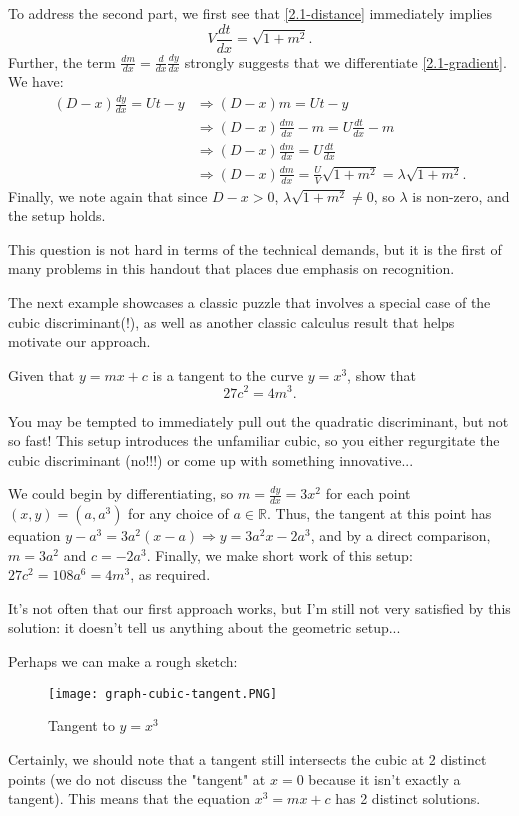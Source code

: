 \documentclass[../jarvis.tex]{subfiles}
\begin{document}
To address the second part, we first see that \eqref{2.1-distance} immediately implies $$V\frac{dt}{dx}=\sqrt{1+m^2}.$$ Further, the term $\frac{dm}{dx}=\frac{d}{dx}\frac{dy}{dx}$ strongly suggests that we differentiate \eqref{2.1-gradient}. We have:
\begin{align*}
    (D-x)\frac{dy}{dx}=Ut-y &\Longrightarrow (D-x)m = Ut-y \\
    &\Longrightarrow (D-x)\frac{dm}{dx}-m=U\frac{dt}{dx}-m \\
    &\Longrightarrow (D-x)\frac{dm}{dx}=U\frac{dt}{dx} \\
    &\Longrightarrow (D-x)\frac{dm}{dx}=\frac{U}{V}\sqrt{1+m^2}=\lambda\sqrt{1+m^2}.
\end{align*}
Finally, we note again that since $D-x > 0$, $\lambda\sqrt{1+m^2} \neq 0$, so $\lambda$ is non-zero, and the setup holds.  

\begin{moral}
This question is not hard in terms of the technical demands, but it is the first of many problems in this handout that places due emphasis on recognition.
\end{moral}

The next example showcases a classic puzzle that involves a special case of the cubic discriminant(!), as well as another classic calculus result that helps motivate our approach.
\begin{example}
Given that $y=mx+c$ is a tangent to the curve $y=x^3$, show that 
$$27c^2=4m^3.$$
\end{example}
You may be tempted to immediately pull out the quadratic discriminant, but not so fast! This setup introduces the unfamiliar cubic, so you either regurgitate the cubic discriminant (no!!!) or come up with something innovative...

We could begin by differentiating, so $m=\frac{dy}{dx}=3x^2$ for each point $(x,y)=(a,a^3)$ for any choice of $a \in \mathbb{R}$. Thus, the tangent at this point has equation $y-a^3=3a^2(x-a) \Longrightarrow y=3a^2x-2a^3$, and by a direct comparison, $m=3a^2$ and $c=-2a^3$.
Finally, we make short work of this setup: $27c^2=108a^6=4m^3$, as required.

It's not often that our first approach works, but I'm still not very satisfied by this solution: it doesn't tell us anything about the geometric setup...

Perhaps we can make a rough sketch:
\begin{figure}[H]
    \centering
    \texttt{[image: graph-cubic-tangent.PNG]}
    \caption{Tangent to $y=x^3$}
    \label{fig:graph-cubic-tangent}
\end{figure}
Certainly, we should note that a tangent still intersects the cubic at 2 distinct points (we do not discuss the "tangent" at $x=0$ because it isn't exactly a tangent). This means that the equation $x^3=mx+c$ has 2 distinct solutions.
\end{document}
